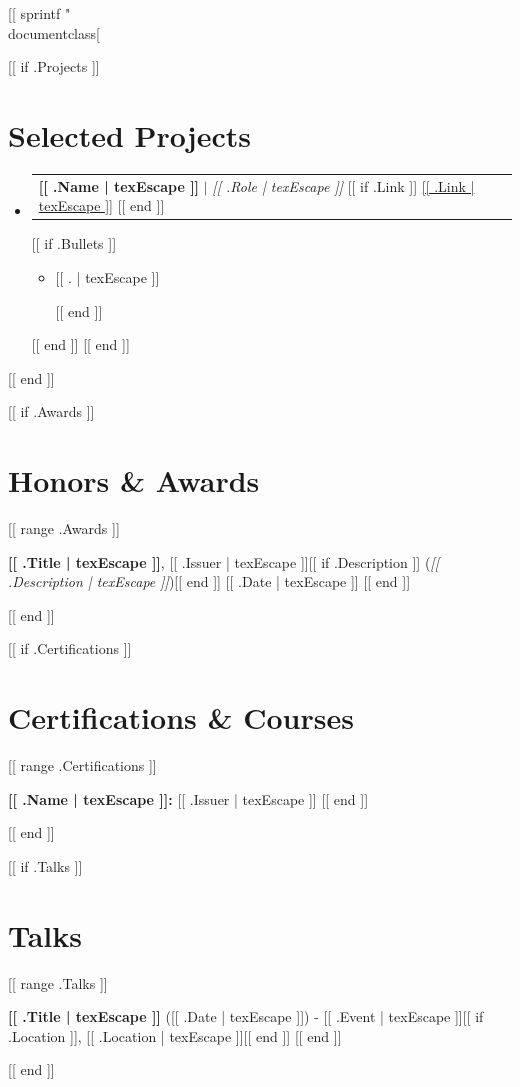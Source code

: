 [[ sprintf "\\documentclass[%
\makeatletter
\newcommand{\resumeItem}[1]{
  \item\small{
    {#1 \vspace{-2pt}}
  }
}
\newcommand{\resumeProjectHeading}[2]{
    \item
    \begin{tabular*}{0.97\textwidth}{l@{\extracolsep{\fill}}r}
      \small#1 & #2 \\
    \end{tabular*}\vspace{-7pt}
}
\newcommand{\resumeSubHeadingListStart}{\begin{itemize}[leftmargin=0.15in, label={}]}
\newcommand{\resumeSubHeadingListEnd}{\end{itemize}}
\newcommand{\resumeItemListStart}{\begin{itemize}}
\newcommand{\resumeItemListEnd}{\end{itemize}\vspace{-5pt}}
\makeatother
\begin{document}
[[ if .Projects ]]
\section{Selected Projects}
    \resumeSubHeadingListStart
      [[ range .Projects ]]
      \resumeProjectHeading
          {\textbf{[[ .Name | texEscape ]]} $|$ \emph{[[ .Role | texEscape ]]} [[ if .Link ]] \href{[[ .Link | texEscape ]]}{[[ .Link | texEscape ]]} [[ end ]]} {}
          [[ if .Bullets ]]
          \resumeItemListStart
            [[ range texLines .Bullets ]]\resumeItem{[[ . | texEscape ]]}
            [[ end ]]
          \resumeItemListEnd
          [[ end ]]
      [[ end ]]
    \resumeSubHeadingListEnd
[[ end ]]


[[ if .Awards ]]
\section{Honors \& Awards}
 \begin{itemize}[leftmargin=0.15in, label={}]
    \small{
     [[ range .Awards ]]
     \item \textbf{[[ .Title | texEscape ]]}, [[ .Issuer | texEscape ]][[ if .Description ]] (\textit{[[ .Description | texEscape ]]})[[ end ]] \hfill [[ .Date | texEscape ]]
     [[ end ]]
    }
 \end{itemize}
[[ end ]]


[[ if .Certifications ]]
\section{Certifications \& Courses}
 \begin{itemize}[leftmargin=0.15in, label={}]
    \small{
     [[ range .Certifications ]]
     \item \textbf{[[ .Name | texEscape ]]:} [[ .Issuer | texEscape ]]
     [[ end ]]
    }
 \end{itemize}
[[ end ]]

[[ if .Talks ]]
\section{Talks}
 \begin{itemize}[leftmargin=0.15in, label={}]
    \small{
     [[ range .Talks ]]
     \item \textbf{[[ .Title | texEscape ]]} ([[ .Date | texEscape ]]) - [[ .Event | texEscape ]][[ if .Location ]], [[ .Location | texEscape ]][[ end ]]
     [[ end ]]
    }
 \end{itemize}
[[ end ]]
\end{document}
